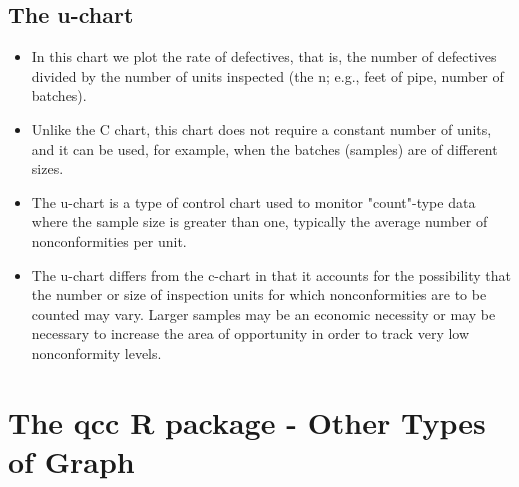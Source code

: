 \documentclass[]{article}
\begin{document}
\subsection{The u-chart}
\begin{itemize}
\item In this chart we plot the rate of defectives, that is, the number of defectives divided by the number of units inspected (the n; e.g., feet of pipe, number of batches). 
\item Unlike the C chart, this chart does not require a constant number of units, and it can be used, for example, when the batches (samples) are of different sizes.

\item The u-chart is a type of control chart used to monitor "count"-type data where the sample size is greater than one, typically the average number of nonconformities per unit.

\item The u-chart differs from the c-chart in that it accounts for the possibility that the number or size of inspection units for which nonconformities are to be counted may vary. Larger samples may be an economic necessity or may be necessary to increase the area of opportunity in order to track very low nonconformity levels.
\end{itemize}


\section{The \textbf{qcc} R package - Other Types of Graph}
\end{document}
